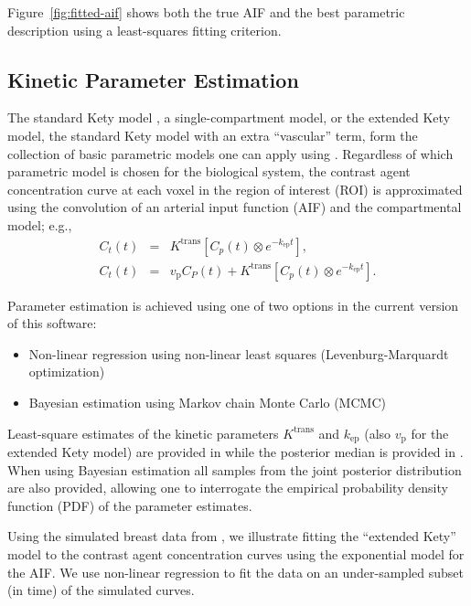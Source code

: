 \documentclass[article]{jss}
\newcommand{\ktrans}{K^\text{trans}}
\newcommand{\kep}{k_\text{ep}}
\newcommand{\vp}{v_\text{p}}
\begin{document}
Figure~\ref{fig:fitted-aif} shows both the true AIF and the best
parametric description using a least-squares fitting criterion.

\subsection[Kinetic Parameter Estimation]{Kinetic Parameter Estimation}

The standard Kety model \citep{ket:blood-tissue}, a single-compartment
model, or the extended Kety model, the standard Kety model with an
extra ``vascular'' term, form the collection of basic parametric
models one can apply using .  Regardless of which
parametric model is chosen for the biological system, the contrast
agent concentration curve at each voxel in the region of interest
(ROI) is approximated using the convolution of an arterial input
function (AIF) and the compartmental model; e.g.,
\begin{eqnarray*}
  C_t(t) &=& \ktrans \left[ C_p(t) \otimes e^{-\kep t} \right],\\
  C_t(t) &=& \vp C_P(t) + \ktrans \left[ C_p(t) \otimes e^{-\kep t}
    \right].
\end{eqnarray*}

Parameter estimation is achieved using one of two options in the
current version of this software:
\begin{itemize}
\item Non-linear regression using non-linear least squares
  (Levenburg-Marquardt optimization)
\item Bayesian estimation using Markov chain Monte Carlo (MCMC)
  \citep{sch-etal:TMI}
\end{itemize}
Least-square estimates of the kinetic parameters $\ktrans$ and $\kep$
(also $\vp$ for the extended Kety model) are provided in
 while the posterior median is provided in
.  When using Bayesian estimation all samples from
the joint posterior distribution are also provided, allowing one to
interrogate the empirical probability density function (PDF) of the
parameter estimates.

Using the simulated breast data from \cite{buc:uncertainty}, we
illustrate fitting the ``extended Kety'' model to the contrast agent
concentration curves using the exponential model for the AIF.  We use
non-linear regression to fit the data on an under-sampled subset (in
time) of
the simulated curves.
\end{document}
